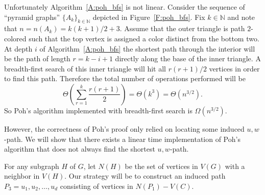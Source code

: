 \documentclass[12pt,letterpaper]{article}
\theoremstyle{plain}
\theoremstyle{definition}
\theoremstyle{break}
\begin{document}
Unfortunately Algorithm~\ref{A:poh_bfs}
is not linear. Consider the sequence of ``pyramid graphs''
$\{A_k\}_{k\in\mathbb{N}}$ depicted in
Figure~\ref{F:poh_bfs}.
Fix $k\in\mathbb{N}$ and note that
$n=n(A_k)=k(k+1)/2+3$. Assume
that the outer triangle is path $2$-colored such that the top vertex is
assigned a color distinct from the bottom two. At depth $i$ of
Algorithm~\ref{A:poh_bfs}
the shortest path through the interior will be the path of length
$r=k-i+1$ directly along the base of the inner triangle. A breadth-first search
of this inner triangle will hit all $r(r+1)/2$ vertices in order to find this
path. Therefore the total number of operations performed will be
\[
    \Theta\left( \sum_{r=1}^k\frac{r(r+1)}{2} \right)
    =\Theta(k^3)
    =\Theta(n^{3/2}).
\]
So Poh's algorithm implemented with breadth-first search is $\Omega(n^{3/2})$.

However, the correctness of Poh's proof only relied on
locating some induced $u,w$-path.
We will show that there exists a linear time implementation of Poh's
algorithm that does not always find the shortest $u,w$-path.

For any subgraph $H$ of $G$, let $N(H)$ be the set of vertices in $V(G)$ with a
neighbor in $V(H)$. Our strategy will be to construct an induced
path $P_3=u_1,u_2,\ldots,u_d$ consisting of vertices in $N(P_1)-V(C)$.
\end{document}
